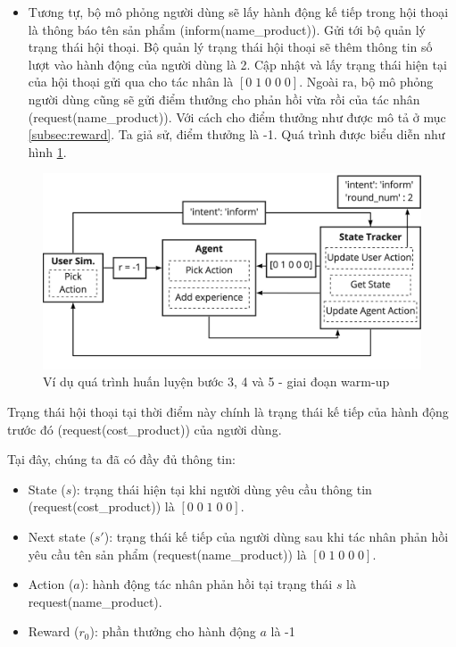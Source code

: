 \begin{itemize}
    \item Tương tự, bộ mô phỏng người dùng sẽ lấy hành động kế tiếp
    trong hội thoại là thông báo tên sản phẩm (inform(name\_product)).
    Gửi tới bộ quản lý trạng thái hội thoại. Bộ quản lý trạng thái
    hội thoại sẽ thêm thông tin số lượt vào hành động của người dùng
    là 2. Cập nhật và lấy trạng thái hiện tại của hội thoại gửi qua
    cho tác nhân là $[0\; 1\; 0\; 0\; 0]$. Ngoài ra, bộ mô phỏng
    người dùng cũng sẽ gửi điểm thưởng cho phản hồi vừa rồi của
    tác nhân (request(name\_product)). Với cách cho điểm thưởng như
    được mô tả ở mục \ref{subsec:reward}. Ta giả sử, điểm thưởng là
    -1. Quá trình được biểu diễn như hình \ref{fig:examwarmup2}.
\end{itemize}

\begin{figure}[ht!]
    \centering
    \includegraphics[scale=0.15]{thesis/chatbot/phuongphap/img/warmup_exam2.jpg}
    \caption{Ví dụ quá trình huấn luyện bước 3, 4 và 5 - giai đoạn warm-up}
    \label{fig:examwarmup2}
\end{figure}

Trạng thái hội thoại tại thời điểm này chính là trạng thái kế tiếp
của hành động trước đó (request(cost\_product)) của người dùng.

Tại đây, chúng ta đã có đầy đủ thông tin:
\begin{itemize}
    \item State ($s$): trạng thái hiện tại khi người dùng yêu cầu
    thông tin (request(cost\_product)) là $[0\; 0\; 1\; 0\; 0]$.
    \item Next state ($s'$): trạng thái kế tiếp của người dùng
    sau khi tác nhân phản hồi yêu cầu tên sản phẩm
    (request(name\_product)) là $[0\; 1\; 0\; 0\; 0]$.
    \item Action ($a$): hành động tác nhân phản hồi tại
    trạng thái $s$ là request(name\_product).
    \item Reward ($r_0$): phần thưởng cho hành động $a$ là -1
\end{itemize}


